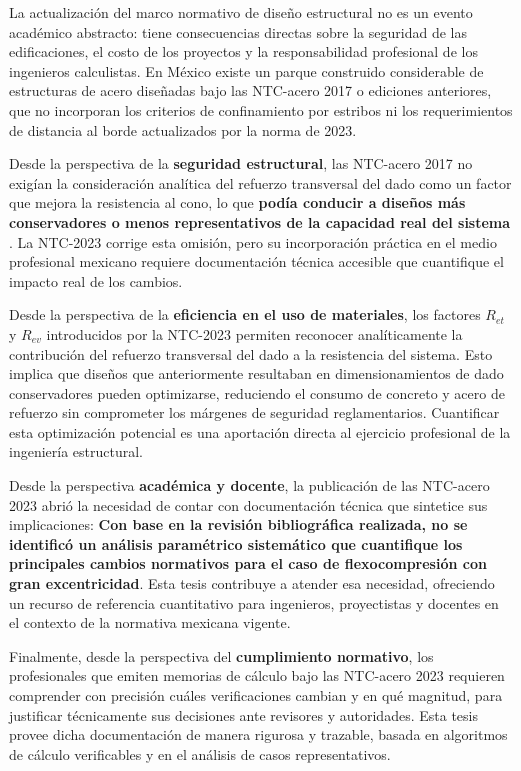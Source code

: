 La actualización del marco normativo de diseño estructural no es un evento académico abstracto:
tiene consecuencias directas sobre la seguridad de las edificaciones, el costo de los proyectos y
la responsabilidad profesional de los ingenieros calculistas. En México existe un parque
construido considerable de estructuras de acero diseñadas bajo las NTC-acero 2017 o ediciones
anteriores, que no incorporan los criterios de confinamiento por estribos ni los requerimientos de
distancia al borde actualizados por la norma de 2023.

Desde la perspectiva de la \textbf{seguridad estructural}, las NTC-acero 2017 no exigían la
consideración analítica del refuerzo transversal del dado como un factor que mejora la resistencia
al cono, lo que \textbf{podía conducir a diseños más conservadores o menos representativos de la
capacidad real del sistema} \cite{AISC_341_2022}. La NTC-2023 corrige esta omisión, pero su
incorporación práctica en el medio profesional mexicano requiere documentación técnica accesible
que cuantifique el impacto real de los cambios.

Desde la perspectiva de la \textbf{eficiencia en el uso de materiales}, los factores $R_{et}$ y
$R_{ev}$ introducidos por la NTC-2023 permiten reconocer analíticamente la contribución del
refuerzo transversal del dado a la resistencia del sistema. Esto implica que diseños que
anteriormente resultaban en dimensionamientos de dado conservadores pueden optimizarse, reduciendo
el consumo de concreto y acero de refuerzo sin comprometer los márgenes de seguridad
reglamentarios. Cuantificar esta optimización potencial es una aportación directa al ejercicio
profesional de la ingeniería estructural.

Desde la perspectiva \textbf{académica y docente}, la publicación de las NTC-acero 2023 abrió la
necesidad de contar con documentación técnica que sintetice sus implicaciones: \textbf{Con base en
la revisión bibliográfica realizada, no se identificó un análisis paramétrico sistemático que
cuantifique los principales cambios normativos para el caso de flexocompresión con gran
excentricidad}. Esta
tesis contribuye a atender esa necesidad, ofreciendo un recurso de referencia cuantitativo para
ingenieros, proyectistas y docentes en el contexto de la normativa mexicana vigente.

Finalmente, desde la perspectiva del \textbf{cumplimiento normativo}, los profesionales que
emiten memorias de cálculo bajo las NTC-acero 2023 requieren comprender con precisión cuáles
verificaciones cambian y en qué magnitud, para justificar técnicamente sus decisiones ante
revisores y autoridades. Esta tesis provee dicha documentación de manera rigurosa y trazable,
basada en algoritmos de cálculo verificables y en el análisis de casos representativos.

